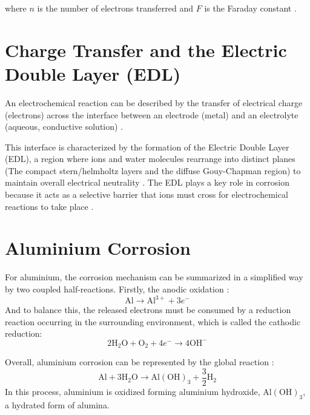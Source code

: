 \documentclass[11pt,twoside,a4paper]{report}
\begin{document}
where $n$ is the number of electrons transferred and $F$ is the Faraday constant \cite{Sastri2007,Ghali2010,Revie2008}.

\section{Charge Transfer and the Electric Double Layer (EDL)}
An electrochemical reaction can be described by the transfer of electrical charge (electrons) across the interface between an electrode (metal) and an electrolyte (aqueous, conductive solution) \cite{Vargel2020,Sastri2007,Revie2008,Ghali2010}.

This interface is characterized by the formation of the Electric Double Layer (EDL), a region where ions and water molecules rearrange into distinct planes (The compact stern/helmholtz layers and the diffuse Gouy-Chapman region) to maintain overall electrical neutrality \cite{Vargel2020,Ghali2010,Sastri2007}. The EDL plays a key role in corrosion because it acts as a selective barrier that ions must cross for electrochemical reactions to take place \cite{Vargel2020,Ghali2010,Marcus2011}. 

\section{Aluminium Corrosion}

For aluminium, the corrosion mechanism can be summarized in a simplified 
way by two coupled half-reactions. Firstly, the anodic oxidation \cite{Vargel2020,Ghali2010}:
\begin{equation}
\mathrm{Al} \rightarrow \mathrm{Al}^{3+} + 3e^-
\end{equation}
And to balance this, the released electrons must be consumed by a reduction 
reaction occurring in the surrounding environment, which is called the cathodic reduction:
\begin{equation}
2\mathrm{H}_2\mathrm{O} + \mathrm{O}_2 + 4e^- \rightarrow 4\mathrm{OH}^-
\end{equation}

Overall, aluminium corrosion can be represented by the global reaction \cite{Vargel2020,Ghali2010}:
\begin{equation}
\mathrm{Al} + 3\mathrm{H}_2\mathrm{O} \rightarrow \mathrm{Al(OH)}_3 + \frac{3}{2} \mathrm{H}_2
\end{equation}
In this process, aluminium is oxidized forming aluminium hydroxide, 
$\mathrm{Al(OH)}_3$, a hydrated form of alumina.
\end{document}
